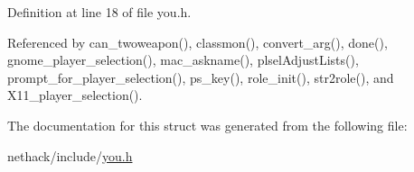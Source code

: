 Definition at line 18 of file you.\+h.



Referenced by can\+\_\+twoweapon(), classmon(), convert\+\_\+arg(), done(), gnome\+\_\+player\+\_\+selection(), mac\+\_\+askname(), plsel\+Adjust\+Lists(), prompt\+\_\+for\+\_\+player\+\_\+selection(), ps\+\_\+key(), role\+\_\+init(), str2role(), and X11\+\_\+player\+\_\+selection().



The documentation for this struct was generated from the following file\+:\begin{DoxyCompactItemize}
\item 
nethack/include/\hyperlink{you_8h}{you.\+h}\end{DoxyCompactItemize}
